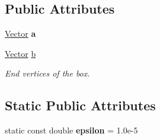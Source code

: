 \subsection*{Public Attributes}
\begin{DoxyCompactItemize}
\item 
\hypertarget{class_box_af9c25486a750badb5e746ba616e44bce}{
\hyperlink{class_vector}{Vector} {\bfseries a}}
\label{class_box_af9c25486a750badb5e746ba616e44bce}

\item 
\hypertarget{class_box_a9ba6812e3bc99ab5faf29f44550b57f5}{
\hyperlink{class_vector}{Vector} \hyperlink{class_box_a9ba6812e3bc99ab5faf29f44550b57f5}{b}}
\label{class_box_a9ba6812e3bc99ab5faf29f44550b57f5}

\begin{DoxyCompactList}\small\item\em End vertices of the box. \item\end{DoxyCompactList}\end{DoxyCompactItemize}
\subsection*{Static Public Attributes}
\begin{DoxyCompactItemize}
\item 
\hypertarget{class_box_ab038c94f04821a9ab0e0313819e5187c}{
static const double {\bfseries epsilon} = 1.0e-\/5}
\label{class_box_ab038c94f04821a9ab0e0313819e5187c}

\end{DoxyCompactItemize}
